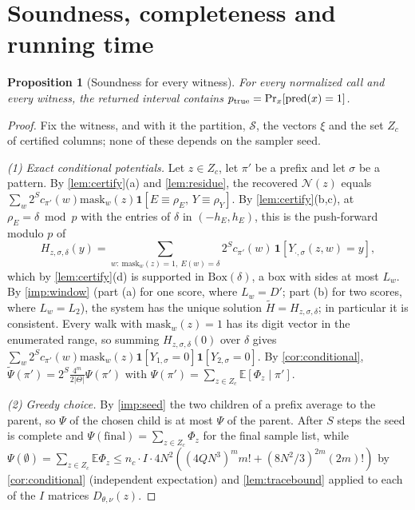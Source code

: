 \documentclass[11pt,letterpaper]{article}
\newtheorem{proposition}[theorem]{Proposition}
\theoremstyle{definition}
\theoremstyle{remark}
\newcommand{\E}{\mathbb E}
\newcommand{\mask}{\mathrm{mask}}
\newcommand{\pred}{\mathrm{pred}}
\newcommand{\Bx}{\mathrm{Box}}
\newcommand{\ind}{\mathbf 1}
\newcommand{\cS}{\mathcal S}
\begin{document}
\section{Soundness, completeness and running time}\label{sec:analysis}

\begin{proposition}[Soundness for every witness]\label{prop:sound}
For every normalized call and every witness, the returned interval
contains \(p_{\rm true}=\Pr_x[\pred(x)=1]\).
\end{proposition}
\begin{proof}
Fix the witness, and with it the partition, \(\cS\), the vectors
\(\xi\) and the set \(Z_c\) of certified columns; none of these depends
on the sampler seed.

\emph{(1) Exact conditional potentials.} Let \(z\in Z_c\), let \(\pi'\)
be a prefix and let \(\sigma\) be a pattern. By
\cref{lem:certify}(a) and \cref{lem:residue}, the recovered
\(\mathcal N(z)\) equals
\(\sum_w2^Sc_{\pi'}(w)\mask_w(z)\ind[E\equiv\rho_E,\,Y\equiv\rho_Y]\). By
\cref{lem:certify}(b,c), at \(\rho_E=\delta\bmod p\) with the entries of
\(\delta\) in \((-h_E,h_E)\), this is the push-forward modulo \(p\) of
\[
 H_{z,\sigma,\delta}(y)=\sum_{w:\ \mask_w(z)=1,\ E(w)=\delta}2^Sc_{\pi'}(w)\,\ind[Y_{\cdot,\sigma}(z,w)=y],
\]
which by \cref{lem:certify}(d) is supported in \(\Bx(\delta)\), a box
with sides at most \(L_w\). By \cref{imp:window} (part (a) for one
score, where \(L_w=D'\); part (b) for two scores, where \(L_w=L_2\)),
the system has the unique solution \(\widetilde H=H_{z,\sigma,\delta}\);
in particular it is consistent. Every walk with \(\mask_w(z)=1\) has
its digit vector in the enumerated range, so summing
\(H_{z,\sigma,\delta}(0)\) over \(\delta\) gives
\(\sum_w2^Sc_{\pi'}(w)\mask_w(z)\ind[Y_{1,\sigma}=0]\ind[Y_{2,\sigma}=0]\).
By \cref{cor:conditional},
\(\widetilde\Psi(\pi')=2^S\frac{4^m}{2|\Theta|}\Psi(\pi')\) with
\(\Psi(\pi')=\sum_{z\in Z_c}\E[\Phi_z\mid\pi']\).

\emph{(2) Greedy choice.} By \cref{imp:seed} the two children of a
prefix average to the parent, so \(\Psi\) of the chosen child is at most
\(\Psi\) of the parent. After \(S\) steps the seed is complete and
\(\Psi(\text{final})=\sum_{z\in Z_c}\Phi_z\) for the final sample list,
while
\(\Psi(\emptyset)=\sum_{z\in Z_c}\E\Phi_z\le n_c\cdot I\cdot4N^2((4QN^3)^mm!+(8N^2/3)^{2m}(2m)!)\)
by \cref{cor:conditional} (independent expectation) and
\cref{lem:tracebound} applied to each of the \(I\) matrices
\(D_{\theta,\nu}(z)\).


\end{proof}
\end{document}
